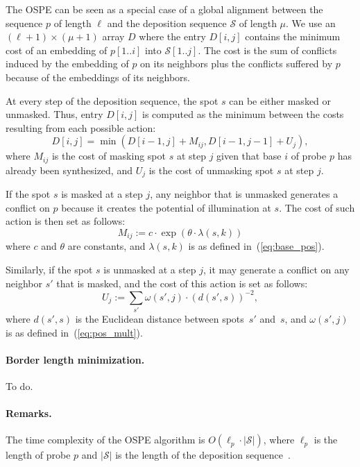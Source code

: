 \documentclass[runningheads]{llncs}
\begin{document}
The OSPE can be seen as a special case of a global alignment between the
sequence $p$ of length $\ell$ and the deposition sequence $\mathcal{S}$ of length
$\mu$. We use an $(\ell + 1) \times (\mu + 1)$ array $D$ where the entry $D[i,j]$
contains the minimum cost of an embedding of $p[1..i]$ into $\mathcal{S}[1..j]$.
The cost is the sum of conflicts induced by the embedding of $p$ on its neighbors
plus the conflicts suffered by $p$ because of the embeddings of its neighbors.

At every step of the deposition sequence, the spot $s$ can be either masked or
unmasked. Thus, entry $D[i,j]$ is computed as the minimum between the costs
resulting from each possible action:
\begin{equation}
D[i,j] = \min (D[i-1,j] + M_{ij}, D[i-1,j-1] + U_{j}),
\end{equation}
where $M_{ij}$ is the cost of masking spot $s$ at step $j$ given that base $i$ of
probe $p$ has already been synthesized, and $U_{j}$ is the cost of unmasking spot
$s$ at step $j$.

If the spot $s$ is masked at a step $j$, any neighbor that is unmasked generates
a conflict on $p$ because it creates the potential of illumination at $s$. The
cost of such action is then set as follows:
\begin{equation}
M_{ij} := c \cdot \exp{\left(\theta \cdot \lambda(s,k)\right)}
\end{equation}
where $c$ and $\theta$ are constants, and $\lambda(s,k)$ is as defined
in~(\ref{eq:base_pos}).

Similarly, if the spot $s$ is unmasked at a step $j$, it may generate a conflict
on any neighbor $s'$ that is masked, and the cost of this action is set as follows:
\begin{equation}
U_{j} := \sum_{s'} \omega(s',j) \cdot (d(s',s))^{-2},
\end{equation}
where $d(s',s)$ is the Euclidean distance between spots~$s'$ and~$s$, and
$\omega(s',j)$ is as defined in~(\ref{eq:pos_mult}).

\paragraph{Border length minimization.} To do.

\paragraph{Remarks.}
The time complexity of the OSPE algorithm is $O(\ell_p \cdot |\mathcal{S}|)$,
where $\ell_p$ is the length of probe $p$ and $|\mathcal{S}|$ is the length of
the deposition sequence~\cite{KAHNG02}.
\end{document}
